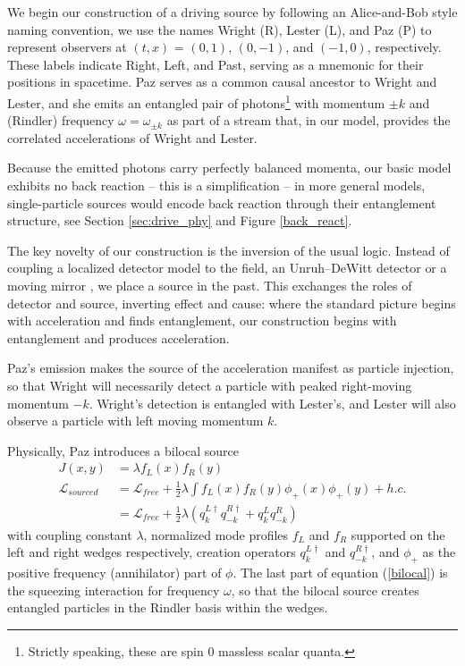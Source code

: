 \documentclass[12pt,a4paper]{article}
\begin{document}
We begin our construction of a driving source by following an Alice-and-Bob style naming convention, we use the names Wright (R), Lester (L), and Paz (P) to represent observers at $(t,x)$ = $(0,1)$, $(0,-1)$, and $(-1,0)$, respectively. These labels indicate Right, Left, and Past, serving as a mnemonic for their positions in spacetime. Paz serves as a common causal ancestor to Wright and Lester, and she emits an entangled pair of photons\footnote{Strictly speaking, these are spin 0 massless scalar quanta.} with momentum $\pm k$ and (Rindler) frequency $\omega = \omega_{\pm k}$ as part of a stream that, in our model, provides the correlated accelerations of Wright and Lester.

Because the emitted photons carry perfectly balanced momenta, our basic model exhibits no back reaction -- this is a simplification -- in more general models, single-particle sources would encode back reaction through their entanglement structure, see Section \ref{sec:drive_phy} and Figure \ref{back_react}.

The key novelty of our construction is the inversion of the usual logic. Instead of coupling a localized detector model to the field, an Unruh–DeWitt detector \cite{unruh1976notes,einstein1979general} or a moving mirror \cite{fulling1976radiation}, we place a source in the past. This exchanges the roles of detector and source, inverting effect and cause: where the standard picture begins with acceleration and finds entanglement, our construction begins with entanglement and produces acceleration.

Paz's emission makes the source of the acceleration manifest as particle injection, so that Wright will necessarily detect a particle with peaked right-moving momentum $-k$. Wright’s detection is entangled with Lester’s, and Lester will also observe a particle with left moving momentum $k$.

Physically, Paz introduces a bilocal source 
\begin{equation}
  \begin{aligned}
    J(x,y) &= \lambda f_L(x)f_R(y)\\
    \mathscr{L}_{sourced} & = \mathscr{L}_{free} + \frac{1}{2}\lambda \int f_L(x)f_R(y) \phi_+(x) \phi_+(y)  + h.c.\\
                        &= \mathscr{L}_{free} + \frac{1}{2}\lambda \left(q_{k}^{L\dagger} q_{-k}^{R\dagger} + q_{k}^{L} q_{-k}^{R} \right)
 \end{aligned}
 \label{bilocal}
\end{equation}
with coupling constant $\lambda$, normalized mode profiles $f_L$ and $f_R$ supported on the left and right wedges respectively, creation operators $q_{k}^{L\dagger}$ and $q_{-k}^{R\dagger}$, and $\phi_+$ as the positive frequency (annihilator) part of $\phi$. The last part of equation (\ref{bilocal}) is the squeezing interaction for frequency $\omega$, so that the bilocal source creates entangled particles in the Rindler basis within the wedges.
\end{document}
